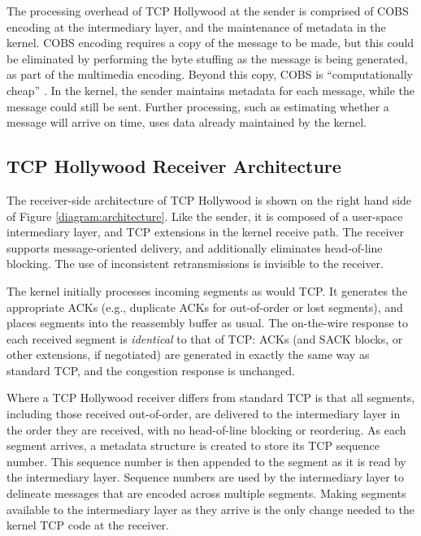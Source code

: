 The processing overhead of TCP Hollywood at the sender is comprised of
COBS encoding at the intermediary layer, and the maintenance of metadata
in the kernel. COBS encoding requires a copy of
the message to be made, but this could be eliminated by performing the byte
stuffing as the message is being generated, as part of the multimedia
encoding. Beyond this copy, COBS is ``computationally cheap''
\cite{chesire:1997:COBS}. In the kernel, the sender maintains
metadata for each message, while the message could still be sent. Further
processing, such as estimating whether a message will arrive on time, uses
data already maintained by the kernel.

\subsection{TCP Hollywood Receiver Architecture}
\label{subsec:receiver}


The receiver-side architecture of TCP Hollywood is shown on the right hand
side of Figure \ref{diagram:architecture}. Like the sender, it is composed
of a user-space intermediary layer, and TCP extensions in the kernel
receive path. The receiver supports message-oriented delivery, and
additionally eliminates head-of-line blocking. The use of inconsistent
retransmissions is invisible to the receiver.

The kernel initially processes incoming segments as would TCP. It
generates the appropriate ACKs (e.g., duplicate ACKs for out-of-order or
lost segments), and places segments into the reassembly buffer as usual.
The on-the-wire response to each received segment is \emph{identical} to
that of TCP: ACKs (and SACK blocks, or other extensions, if negotiated)
are generated in exactly the same way as standard TCP, and the congestion
response is unchanged.

Where a TCP Hollywood receiver differs from standard TCP is that all
segments, including those received out-of-order, are
delivered to the intermediary layer in the order they are received, with no
head-of-line blocking or reordering. As each segment arrives, a metadata
structure is created to store its TCP sequence number. This sequence number
is then appended to the segment as it is read by the intermediary layer.
Sequence numbers are used by the intermediary layer to delineate messages
that are encoded across multiple segments. Making segments available to the
intermediary layer as they arrive is the only change needed to the kernel
TCP code at the receiver.

